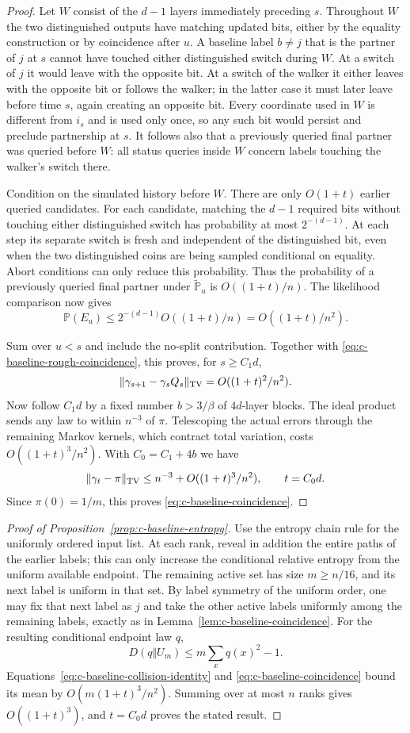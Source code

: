 \begin{proof}
Let $W$ consist of the $d-1$ layers immediately preceding $s$.
Throughout $W$ the two distinguished outputs have matching updated
bits, either by the equality construction or by coincidence after $u$.
A baseline label $b\ne j$ that is the partner of $j$ at $s$ cannot
have touched either distinguished switch during $W$.  At a switch
of $j$ it would leave with the opposite bit.  At a switch of the
walker it either leaves with the opposite bit or follows the walker;
in the latter case it must later leave before time $s$, again creating
an opposite bit.  Every coordinate used in $W$ is different from
$i_s$ and is used only once, so any such bit would persist and preclude
partnership at $s$.  It follows also that a previously queried final
partner was queried before $W$: all status queries inside $W$ concern
labels touching the walker's switch there.

Condition on the simulated history before $W$.  There are only
$O(1+t)$ earlier queried candidates.  For each candidate, matching the
$d-1$ required bits without touching either distinguished switch has
probability at most $2^{-(d-1)}$.  At each step its separate switch is
fresh and independent of the distinguished bit, even when the two
distinguished coins are being sampled conditional on equality.  Abort
conditions can only reduce this probability. Thus the probability of a
previously queried final partner under $\widetilde{\mathbb P}_u$ is
$O((1+t)/n)$. The likelihood comparison now gives
\[
 \mathbb P(E_u)\le 2^{-(d-1)}O((1+t)/n)
                    =O((1+t)/n^2).
\]

Sum over $u<s$ and include the no-split contribution.  Together with
\eqref{eq:c-baseline-rough-coincidence}, this proves, for $s\ge C_1d$,
\[
 \|\gamma_{s+1}-\gamma_sQ_s\|_{\rm TV}
 =O((1+t)^2/n^2).
\]
Now follow $C_1d$ by a fixed number $b>3/\beta$ of $4d$-layer blocks.
The ideal product sends any law to within $n^{-3}$ of $\pi$.
Telescoping the actual errors through the remaining Markov kernels,
which contract total variation, costs $O((1+t)^3/n^2)$.
With $C_0=C_1+4b$ we have
\[
 \|\gamma_t-\pi\|_{\rm TV}
 \le n^{-3}+O((1+t)^3/n^2),\qquad t=C_0d.
\]
Since $\pi(0)=1/m$, this proves
\eqref{eq:c-baseline-coincidence}.
\end{proof}

\begin{proof}[Proof of Proposition~\ref{prop:c-baseline-entropy}]
Use the entropy chain rule for the uniformly ordered input list.
At each rank, reveal in addition the entire paths of the earlier
labels; this can only increase the conditional relative entropy from
the uniform available endpoint.  The remaining active set has size
$m\ge n/16$, and its next label is uniform in that set.  By label
symmetry of the uniform order, one may fix that next label as $j$ and
take the other active labels uniformly among the remaining labels,
exactly as in Lemma~\ref{lem:c-baseline-coincidence}.
For the resulting conditional endpoint law $q$,
\[
 D(q\Vert U_m)\le m\sum_xq(x)^2-1.
\]
Equations~\eqref{eq:c-baseline-collision-identity} and
\eqref{eq:c-baseline-coincidence} bound its mean by
$O(m(1+t)^3/n^2)$.  Summing over at most $n$ ranks gives
$O((1+t)^3)$, and $t=C_0d$ proves the stated result.
\end{proof}

